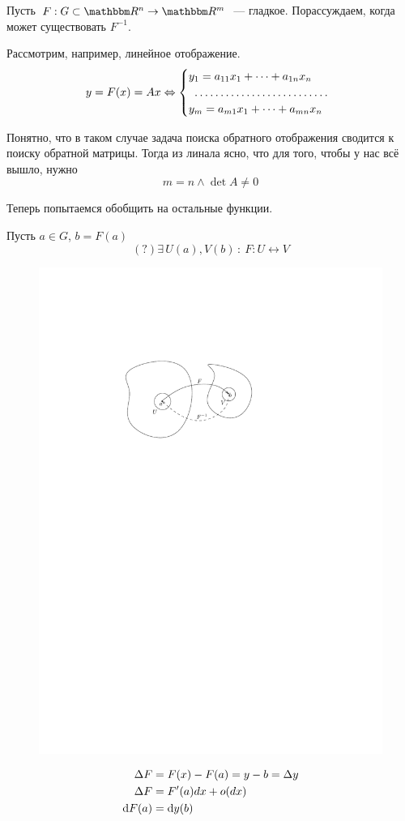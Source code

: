 \documentclass[12pt,timbord]{../../../notes}
\begin{document}
Пусть $F: G\subset \R^n \to \R^m$~--- гладкое. Порассуждаем, когда может существовать $F^{-1}$.

Рассмотрим, например, линейное отображение.
\[
  y = F(x) = Ax \Leftrightarrow 
  \begin{cases}
    y_1 = a_{11} x_1 + \dotsb + a_{1n} x_n \\
    \hdotsfor{1}\\
    y_m = a_{m1} x_1 + \dotsb + a_{mn} x_n
  \end{cases}
\]

Понятно, что в таком случае задача поиска обратного отображения сводится к поиску обратной матрицы.
Тогда из линала ясно, что для того, чтобы у нас всё вышло, нужно
\[
  m = n \land \det A \neq 0 
\]

Теперь попытаемся обобщить на остальные функции. 

Пусть $a\in G$, $b = F(a)$
\[
  (?) \exists\, U(a), V(b) \,\colon \: F\colon U \leftrightarrow V
\]

\begin{figure}[h]
  \centering
  \includegraphics[width=0.6\linewidth]{inversemap}
\end{figure}

\begin{align}
  \Delta F &= F(x) - F(a) = y - b = \Delta y \label{eq:diffspace::invmaphandwave::delta}\\
  \Delta F &= F'(a) dx + o(dx) \\
  \mathrm{d} F(a) &= \mathrm{d} y(b) \label{eq:diffspace::invmaphandwave::diff}
\end{align}
\end{document}
